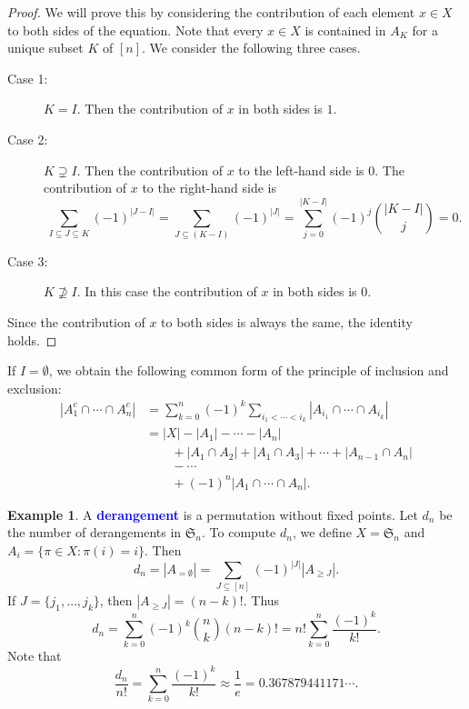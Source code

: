 \documentclass[oneside]{book}
\numberwithin{equation}{section}
\theoremstyle{definition}
\newtheorem{exam}[thm]{Example}
\newcommand\sym{\mathfrak{S}}
\renewcommand\emph[1]{\textcolor{blue}{\bf #1}}
\begin{document}
\begin{proof}
  We will prove this by considering the contribution of each element
  \( x\in X \) to both sides of the equation. Note that every
  \( x\in X \) is contained in \( A_K \) for a unique subset \( K \)
  of \( [n] \). We consider the following three cases.

  \begin{description}
  \item[Case 1:] \( K=I \). Then the contribution of \( x \) in both sides is \( 1 \).
  \item[Case 2:] \( K \supsetneq I \). Then the contribution of
    \( x \) to the left-hand side is \( 0 \). The contribution of
    \( x \) to the right-hand side is
    \[
      \sum_{I \subseteq J \subseteq K} (-1)^{|J-I|} = 
      \sum_{J \subseteq (K-I)} (-1)^{|J|} = \sum_{j=0}^{|K-I|} (-1)^{j}\binom{|K-I|}{j} = 0.
    \]
  \item[Case 3:] \( K \not\supseteq I\). In this case the contribution
    of \( x \) in both sides is \( 0 \).
  \end{description}
  Since the contribution of \( x \) to both sides is always the same,
  the identity holds.
\end{proof}

If \( I=\emptyset \), we obtain the following common form of the principle
of inclusion and exclusion:
\begin{align*}
 \left| A_1^c  \cap \cdots \cap A_n^c \right| 
 &= \sum_{k=0}^{n} (-1)^{k} \sum_{i_1 < \cdots <i_k}
 \left| A_{i_1} \cap \cdots \cap A_{i_k} \right|\\
 &= |X| - |A_1| - \cdots - |A_n|\\
 & \qquad + |A_1\cap A_2| +|A_1\cap A_3| + \cdots + |A_{n-1}\cap A_{n}|\\
 & \qquad  - \cdots \\
 & \qquad + (-1)^{n}|A_1 \cap \cdots \cap A_n|.
\end{align*}


\begin{exam}
  A \emph{derangement} is a permutation without fixed points. Let
  \( d_n \) be the number of derangements in \( \sym_n \). To compute
  \( d_n \), we define \( X=\sym_n \) and
  \( A_i = \{\pi\in X: \pi(i) = i\} \).
  Then 
  \[
    d_n = |A_{=\emptyset}| = \sum_{J\subseteq[n]} (-1)^{|J|}|A_{\ge J}|.
  \]
  If \( J = \{j_1,\dots,j_k\} \), then \( |A_{\ge J}| = (n-k)! \).
  Thus
  \[
    d_n  = \sum_{k=0}^n  (-1)^{k} \binom{n}{k} (n-k)!
    = n! \sum_{k=0}^n  \frac{(-1)^{k}}{k!}.
  \]
  Note that
  \[
    \frac{d_n}{n!} = \sum_{k=0}^n  \frac{(-1)^{k}}{k!} \approx \frac{1}{e} = 0.367879441171\cdots.
  \]
\end{exam}
\end{document}
